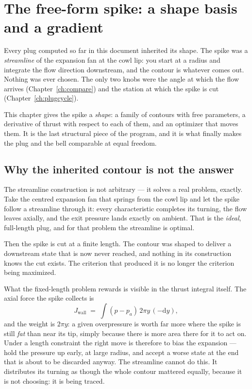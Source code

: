 \chapter{The free-form spike: a shape basis and a gradient}
\label{ch:spline}

Every plug computed so far in this document inherited its shape. The
spike was a \emph{streamline} of the expansion fan at the cowl lip:
you start at a radius and integrate the flow direction downstream, and
the contour is whatever comes out. Nothing was ever chosen. The only
two knobs were the angle at which the flow arrives
(Chapter~\ref{ch:compare}) and the station at which the spike is cut
(Chapter~\ref{ch:plugcycle}).

This chapter gives the spike a \emph{shape}: a family of contours with
free parameters, a derivative of thrust with respect to each of them,
and an optimizer that moves them. It is the last structural piece of
the program, and it is what finally makes the plug and the bell
comparable at equal freedom.

\section{Why the inherited contour is not the answer}
\label{sec:whynotstreamline}

The streamline construction is not arbitrary --- it solves a real
problem, exactly. Take the centred expansion fan that springs from the
cowl lip and let the spike follow a streamline through it: every
characteristic completes its turning, the flow leaves axially, and the
exit pressure lands exactly on ambient. That is the \emph{ideal},
full-length plug, and for that problem the streamline is optimal.

Then the spike is cut at a finite length. The contour was shaped to
deliver a downstream state that is now never reached, and nothing in
its construction knows the cut exists. The criterion that produced it
is no longer the criterion being maximized.

What the fixed-length problem rewards is visible in the thrust
integral itself. The axial force the spike collects is
\begin{equation}
  J_{\text{wall}} \;=\; \int (p - p_a)\, 2\pi y \,(-\mathrm{d}y),
  \label{eq:wallpush}
\end{equation}
and the weight is $2\pi y$: a given overpressure is worth far more
where the spike is still \emph{fat} than near its tip, simply because
there is more area there for it to act on. Under a length constraint
the right move is therefore to bias the expansion --- hold the
pressure up early, at large radius, and accept a worse state at the
end that is about to be discarded anyway. The streamline cannot do
this. It distributes its turning as though the whole contour mattered
equally, because it is not choosing: it is being traced.


